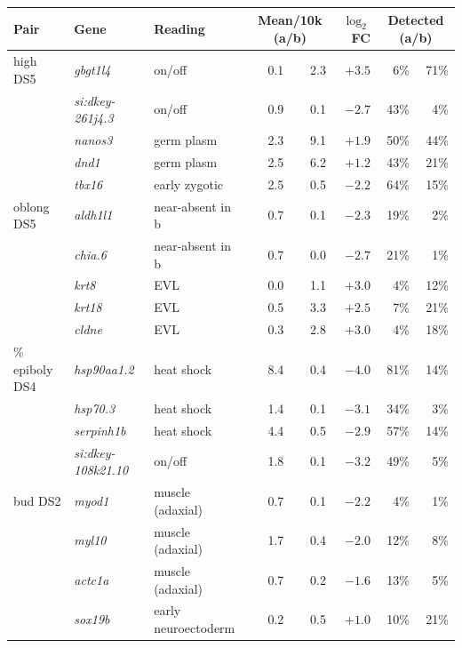 \begin{tabular}{lllrrrrr}
\toprule
Pair & Gene & Reading & \multicolumn{2}{c}{Mean/10k (a/b)} & $\log_2$FC & \multicolumn{2}{c}{Detected (a/b)} \\
\midrule
high DS5 & \emph{gbgt1l4} & on/off & 0.1 & 2.3 & $+3.5$ & 6\% & 71\% \\
 & \emph{si:dkey-261j4.3} & on/off & 0.9 & 0.1 & $-2.7$ & 43\% & 4\% \\
 & \emph{nanos3} & germ plasm & 2.3 & 9.1 & $+1.9$ & 50\% & 44\% \\
 & \emph{dnd1} & germ plasm & 2.5 & 6.2 & $+1.2$ & 43\% & 21\% \\
 & \emph{tbx16} & early zygotic & 2.5 & 0.5 & $-2.2$ & 64\% & 15\% \\
\addlinespace[2pt]
oblong DS5 & \emph{aldh1l1} & near-absent in b & 0.7 & 0.1 & $-2.3$ & 19\% & 2\% \\
 & \emph{chia.6} & near-absent in b & 0.7 & 0.0 & $-2.7$ & 21\% & 1\% \\
 & \emph{krt8} & EVL & 0.0 & 1.1 & $+3.0$ & 4\% & 12\% \\
 & \emph{krt18} & EVL & 0.5 & 3.3 & $+2.5$ & 7\% & 21\% \\
 & \emph{cldne} & EVL & 0.3 & 2.8 & $+3.0$ & 4\% & 18\% \\
\addlinespace[2pt]
50\% epiboly DS4 & \emph{hsp90aa1.2} & heat shock & 8.4 & 0.4 & $-4.0$ & 81\% & 14\% \\
 & \emph{hsp70.3} & heat shock & 1.4 & 0.1 & $-3.1$ & 34\% & 3\% \\
 & \emph{serpinh1b} & heat shock & 4.4 & 0.5 & $-2.9$ & 57\% & 14\% \\
 & \emph{si:dkey-108k21.10} & on/off & 1.8 & 0.1 & $-3.2$ & 49\% & 5\% \\
\addlinespace[2pt]
bud DS2 & \emph{myod1} & muscle (adaxial) & 0.7 & 0.1 & $-2.2$ & 4\% & 1\% \\
 & \emph{myl10} & muscle (adaxial) & 1.7 & 0.4 & $-2.0$ & 12\% & 8\% \\
 & \emph{actc1a} & muscle (adaxial) & 0.7 & 0.2 & $-1.6$ & 13\% & 5\% \\
 & \emph{sox19b} & early neuroectoderm & 0.2 & 0.5 & $+1.0$ & 10\% & 21\% \\
\bottomrule
\end{tabular}
